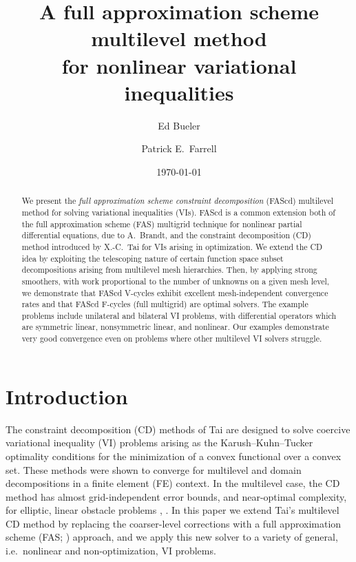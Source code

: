 \documentclass[letterpaper,final,12pt,reqno]{amsart}
\theoremstyle{cstyle}
\theoremstyle{cstyle*}
\theoremstyle{dstyle}
\numberwithin{equation}{section}
\numberwithin{figure}{section}
\numberwithin{table}{section}
\numberwithin{theorem}{section}
\begin{document}
\title[FAS for nonlinear variational inequalities]{A full approximation scheme multilevel method \\ for nonlinear variational inequalities}

\author{Ed Bueler}

\author{Patrick E.~Farrell}

\date{\today}

\begin{abstract}
We present the \emph{full approximation scheme constraint decomposition} (FAScd) multilevel method for solving variational inequalities (VIs).  FAScd is a common extension both of the full approximation scheme (FAS) multigrid technique for nonlinear partial differential equations, due to A.~Brandt, and the constraint decomposition (CD) method introduced by X.-C.~Tai for VIs arising in optimization.  We extend the CD idea by exploiting the telescoping nature of certain function space subset decompositions arising from multilevel mesh hierarchies.  Then, by applying strong smoothers, with work proportional to the number of unknowns on a given mesh level, we demonstrate that FAScd V-cycles exhibit excellent mesh-independent convergence rates and that FAScd F-cycles (full multigrid) are optimal solvers.  The example problems include unilateral and bilateral VI problems, with differential operators which are symmetric linear, nonsymmetric linear, and nonlinear.  Our examples demonstrate very good convergence even on problems where other multilevel VI solvers struggle.
\end{abstract}

\maketitle

\thispagestyle{empty}


\section{Introduction} \label{sec:intro}

The constraint decomposition (CD) methods of Tai \cite{Tai2003} are designed to solve coercive variational inequality (VI) problems arising as the Karush--Kuhn--Tucker optimality conditions for the minimization of a convex functional over a convex set.  These methods were shown to converge for multilevel and domain decompositions in a finite element (FE) context.  In the multilevel case, the CD method has almost grid-independent error bounds, and near-optimal complexity, for elliptic, linear obstacle problems \cite[Subsection 5.4]{Tai2003}, \cite[Theorem 4.6 and Algorithm 4.7]{GraeserKornhuber2009}.  In this paper we extend Tai's multilevel CD method by replacing the coarser-level corrections with a full approximation scheme (FAS; \cite{Brandt1977,Bruneetal2015}) approach, and we apply this new solver to a variety of general, i.e.~nonlinear and non-optimization, VI problems.
\end{document}
